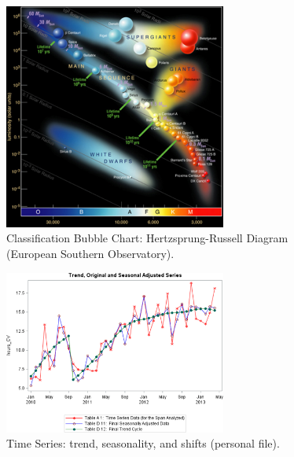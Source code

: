 \begin{figure}[H]
\centering
\includegraphics[width=0.65\textwidth]{images/DV/HR.png}
\caption[\small Classification Bubble Chart: Hertzsprung-Russell Diagram ]{\small Classification Bubble Chart: Hertzsprung-Russell Diagram (European Southern Observatory).} \label{fig:ex_bc_HR}
\end{figure}
\afterpage{\FloatBarrier}
\vfill
\begin{figure}[H]
\centering
\includegraphics[width=0.65\textwidth]{images/DV/TS.png}
\caption[\small Time Series: trend, seasonality, and shifts ]{\small Time Series: trend, seasonality, and shifts (personal file).} \label{fig:ex_ts_cv}
\end{figure}
\afterpage{\FloatBarrier}
\vfill
\newpage



